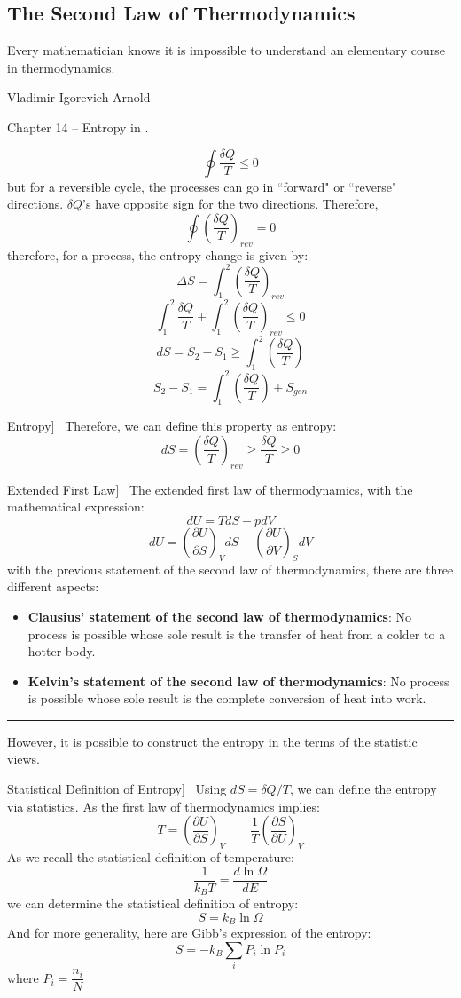 \documentclass[UTF8]{book}
\newenvironment{theorem}[2][Theorem]{\begin{trivlist}
\item[\hskip \labelsep {\bfseries #1}\hskip \labelsep {\bfseries }]}{\end{trivlist}}
\begin{document}
\subsection{The Second Law of Thermodynamics}
\epigraph{Every mathematician knows it is impossible to understand an elementary course in thermodynamics.}{Vladimir Igorevich Arnold}
Chapter 14 -- Entropy in \cite{blundell2009concepts}.
\begin{theorem}[Clausius Inequality]
{For all thermodynamic cycles, reversible or irreversible, the Clausius inequality is valid:}
$$\oint \dfrac{\delta Q}{T}\leq 0$$
 {but for a reversible cycle, the processes can go in ``forward" or ``reverse" directions. $\delta Q$'s have opposite sign for the two directions. Therefore,}
$$\oint \left(\dfrac{\delta Q}{T}\right)_{rev}=0$$
 {therefore, for a process, the entropy change is given by: }
$$\Delta S=\int_{1}^{2}\left(\dfrac{\delta Q}{T}\right)_{rev}$$
$$\int_{1}^{2}\dfrac{\delta Q}{T}+\int_{1}^{2}\left(\dfrac{\delta Q}{T}\right)_{rev}\leq 0$$
$$dS=S_2-S_1\geq \int_{1}^{2}\left(\dfrac{\delta Q}{T}\right)$$
$$S_2-S_1=\int_{1}^{2}\left(\dfrac{\delta Q}{T}\right)+S_{gen}$$
\end{theorem}
\begin{theorem}
[Entropy]~  {Therefore, we can define this property as entropy:}
$$dS=\left(\dfrac{\delta Q}{T}\right)_{rev}\geq \dfrac{\delta Q}{T}\geq 0$$
\end{theorem}

\begin{theorem}
[Extended First Law]~  {The extended first law of thermodynamics, with the mathematical expression:}
$$\boxed{dU=TdS-pdV}$$
$$dU=\left(\dfrac{\partial U}{\partial S}\right)_VdS+\left(\dfrac{\partial U}{\partial V}\right)_SdV$$
 {with the previous statement of the second law of thermodynamics, there are three different aspects:}
\begin{itemize}
\item  {\textbf{Clausius' statement of the second law of thermodynamics}: No process is possible whose sole result is the transfer of heat from a colder to a hotter body.}
\item  {\textbf{Kelvin's statement of the second law of thermodynamics}: No process is possible whose sole result is the complete conversion of heat into work.}
\end{itemize}
\end{theorem}
\rule{\textwidth}{1pt}
{However, it is possible to construct the entropy in the terms of the statistic views.}
\begin{theorem}
[Statistical Definition of Entropy]~  { Using $dS=\delta Q/T$, we can define the entropy via statistics. As the first law of thermodynamics implies:}
$$T=\left(\dfrac{\partial U}{\partial S}\right)_V \qquad \dfrac{1}{T}\left(\dfrac{\partial S}{\partial U}\right)_V$$
 {As we recall the statistical definition of temperature:}
$$\dfrac{1}{k_BT}=\dfrac{d\ln \Omega}{dE}$$
 {we can determine the statistical definition of entropy:}
$$\boxed{S=k_B\ln \Omega }$$
 {And for more generality, here are Gibb's expression of the entropy:}
$$S=-k_B\sum_{i}P_i\ln P_i$$
 {where $P_i=\dfrac{n_i}{N}$}
\end{theorem}
\end{document}
